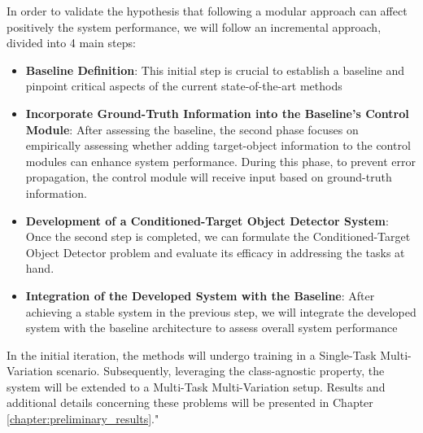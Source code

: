 In order to validate the hypothesis that following a modular approach can affect positively the system performance, we will follow an incremental approach, divided into 4 main steps:
\begin{itemize}
    \item \textbf{Baseline Definition}: This initial step is crucial to establish a baseline and pinpoint critical aspects of the current state-of-the-art methods
    \item \textbf{Incorporate Ground-Truth Information into the Baseline's Control Module}: After assessing the baseline, the second phase focuses on empirically assessing whether adding target-object information to the control modules can enhance system performance. During this phase, to prevent error propagation, the control module will receive input based on ground-truth information.
    \item \textbf{ Development of a Conditioned-Target Object Detector System}: Once the second step is completed, we can formulate the Conditioned-Target Object Detector problem and evaluate its efficacy in addressing the tasks at hand.
    \item \textbf{Integration of the Developed System with the Baseline}: After achieving a stable system in the previous step, we will integrate the developed system with the baseline architecture to assess overall system performance
\end{itemize}
In the initial iteration, the methods will undergo training in a Single-Task Multi-Variation scenario. Subsequently, leveraging the class-agnostic property, the system will be extended to a Multi-Task Multi-Variation setup.
Results and additional details concerning these problems will be presented in Chapter \ref{chapter:preliminary_results}."
